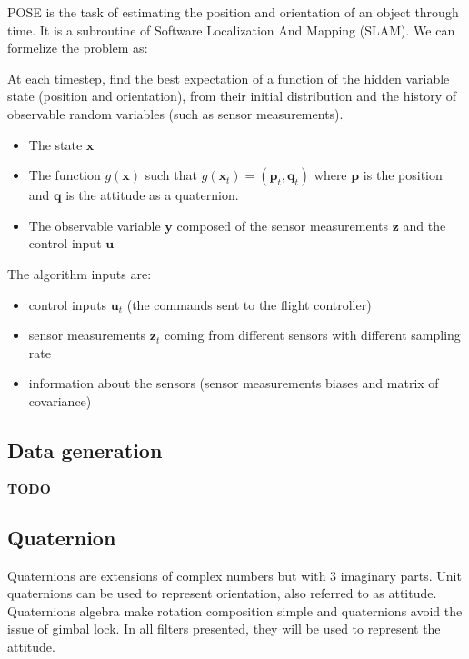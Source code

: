 \documentclass[12pt,]{article}
\providecommand{\tightlist}{%
  \setlength{\itemsep}{0pt}\setlength{\parskip}{0pt}}
\begin{document}
POSE is the task of estimating the position and orientation of an object
through time. It is a subroutine of Software Localization And Mapping
(SLAM). We can formelize the problem as:

At each timestep, find the best expectation of a function of the hidden
variable state (position and orientation), from their initial
distribution and the history of observable random variables (such as
sensor measurements).

\begin{itemize}
\tightlist
\item
  The state \(\mathbf{x}\)
\item
  The function \(g(\mathbf{x})\) such that
  \(g(\mathbf{x}_t) = (\mathbf{p}_t, \mathbf{q}_t)\) where
  \(\mathbf{p}\) is the position and \(\mathbf{q}\) is the attitude as a
  quaternion.
\item
  The observable variable \(\mathbf{y}\) composed of the sensor
  measurements \(\mathbf{z}\) and the control input \(\mathbf{u}\)
\end{itemize}

The algorithm inputs are:

\begin{itemize}
\tightlist
\item
  control inputs \(\mathbf{u}_t\) (the commands sent to the flight
  controller)
\item
  sensor measurements \(\mathbf{z}_t\) coming from different sensors
  with different sampling rate
\item
  information about the sensors (sensor measurements biases and matrix
  of covariance)
\end{itemize}

\subsection{Data generation}\label{data-generation}

\textbf{TODO}

\subsection{Quaternion}\label{quaternion}

Quaternions are extensions of complex numbers but with 3 imaginary
parts. Unit quaternions can be used to represent orientation, also
referred to as attitude. Quaternions algebra make rotation composition
simple and quaternions avoid the issue of gimbal lock. In all filters
presented, they will be used to represent the attitude.
\end{document}
